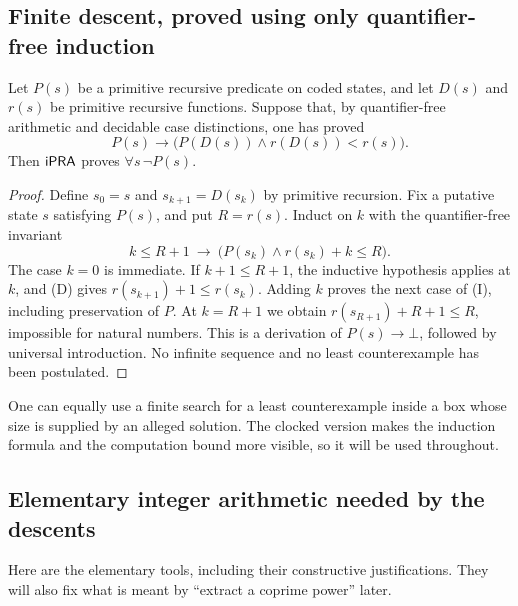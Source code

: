 \subsection{Finite descent, proved using only quantifier-free induction}

\begin{lemma}\label{lem:clocked}
Let $P(s)$ be a primitive recursive predicate on coded states, and let
$D(s)$ and $r(s)$ be primitive recursive functions. Suppose that, by
quantifier-free arithmetic and decidable case distinctions, one has proved
\[
 P(s)\longrightarrow
 \bigl(P(D(s))\wedge r(D(s))<r(s)\bigr).
\tag{D}
\]
Then $\mathsf{iPRA}$ proves $\forall s\,\neg P(s)$.
\end{lemma}

\begin{proof}
Define $s_0=s$ and $s_{k+1}=D(s_k)$ by primitive recursion. Fix a putative
state $s$ satisfying $P(s)$, and put $R=r(s)$. Induct on $k$ with the
quantifier-free invariant
\[
 k\leq R+1\ \longrightarrow\
       \bigl(P(s_k)\wedge r(s_k)+k\leq R\bigr).
\tag{I}
\]
The case $k=0$ is immediate. If $k+1\leq R+1$, the inductive hypothesis
applies at $k$, and (D) gives
$r(s_{k+1})+1\leq r(s_k)$. Adding $k$ proves the next case of (I),
including preservation of $P$. At $k=R+1$ we obtain
$r(s_{R+1})+R+1\leq R$, impossible for natural numbers. This is a
derivation of $P(s)\to\bot$, followed by universal introduction. No
infinite sequence and no least counterexample has been postulated.
\end{proof}

One can equally use a finite search for a least counterexample inside a
box whose size is supplied by an alleged solution. The clocked version
makes the induction formula and the computation bound more visible, so it
will be used throughout.

\subsection{Elementary integer arithmetic needed by the descents}
\label{sec:integer-tools}

Here are the elementary tools, including their constructive justifications.
They will also fix what is meant by ``extract a coprime power'' later.

